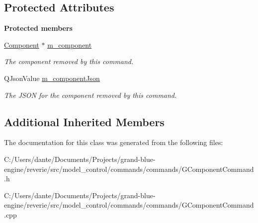 \subsection*{Protected Attributes}
\begin{Indent}\textbf{ Protected members}\par
\begin{DoxyCompactItemize}
\item 
\mbox{\label{classrev_1_1_delete_component_command_a3eb8171130bf61399cc05f5e43bcf414}} 
\mbox{\hyperlink{classrev_1_1_component}{Component}} $\ast$ \mbox{\hyperlink{classrev_1_1_delete_component_command_a3eb8171130bf61399cc05f5e43bcf414}{m\+\_\+component}}
\begin{DoxyCompactList}\small\item\em The component removed by this command. \end{DoxyCompactList}\item 
\mbox{\label{classrev_1_1_delete_component_command_aab52022e1e44ddc4b5e7876d384106a1}} 
Q\+Json\+Value \mbox{\hyperlink{classrev_1_1_delete_component_command_aab52022e1e44ddc4b5e7876d384106a1}{m\+\_\+component\+Json}}
\begin{DoxyCompactList}\small\item\em The J\+S\+ON for the component removed by this command. \end{DoxyCompactList}\end{DoxyCompactItemize}
\end{Indent}
\subsection*{Additional Inherited Members}


The documentation for this class was generated from the following files\+:\begin{DoxyCompactItemize}
\item 
C\+:/\+Users/dante/\+Documents/\+Projects/grand-\/blue-\/engine/reverie/src/model\+\_\+control/commands/commands/G\+Component\+Command.\+h\item 
C\+:/\+Users/dante/\+Documents/\+Projects/grand-\/blue-\/engine/reverie/src/model\+\_\+control/commands/commands/G\+Component\+Command.\+cpp\end{DoxyCompactItemize}

